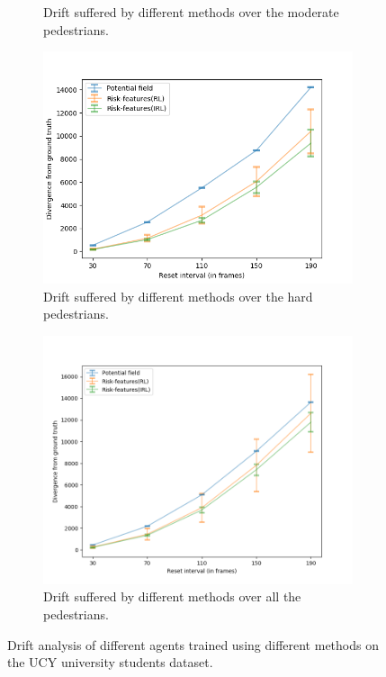 \begin{figure}[htbp]
\begin{subfigure}{0.5\textwidth}
		\caption{Drift suffered by different methods over the moderate pedestrians.}
		\label{fig:inter_method-drift_analysis_med}
	\end{subfigure}
	\begin{subfigure}{0.5\textwidth}
		\centering
		\includegraphics[width=\linewidth]{plots/plot_without_outliers/ucy_inter_method_no_outlier/drift_analysis_hard_no_outliers.png}
		\caption{Drift suffered by different methods over the hard pedestrians.}
		\label{fig:inter_method-drift_analysis_hard}
	\end{subfigure}
	\begin{subfigure}{0.5\textwidth}
		\centering
		\includegraphics[width=\linewidth]{plots/plot_without_outliers/ucy_inter_method_no_outlier/drift_analysis_all_no_outliers.png}
		\caption{Drift suffered by different methods over all the pedestrians.}
		\label{fig:inter_method-drift_analysis_all}
	\end{subfigure}
	\caption{Drift analysis of different agents trained using different methods on the UCY university students dataset.}
\end{figure}

